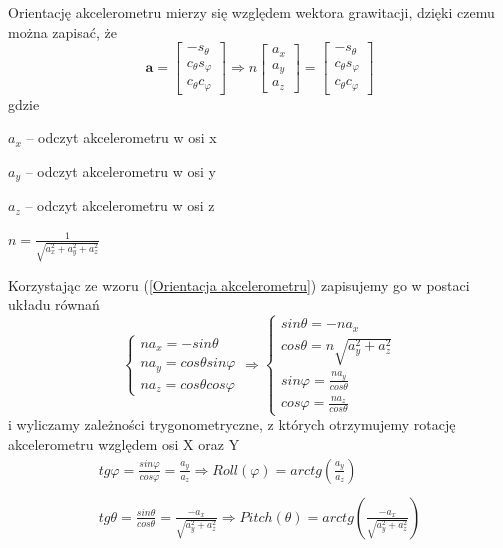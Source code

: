 Orientację akcelerometru mierzy się względem wektora grawitacji, dzięki czemu można zapisać, że
\begin{equation}
    \mathbf{a} =
    \left[
        \begin{array}{c}
            -s_{\theta} \\
            c_{\theta}s_{\varphi} \\
            c_{\theta}c_{\varphi}
        \end{array}
    \right]
    \Rightarrow
    n
    \left[
        \begin{array}{c}
            a_x \\
            a_y \\
            a_z
        \end{array}
    \right]
    =
    \left[
        \begin{array}{c}
            -s_{\theta} \\
            c_{\theta}s_{\varphi} \\
            c_{\theta}c_{\varphi}
        \end{array}
    \right]
    \label{Orientacja akcelerometru}
\end{equation}
gdzie

$a_x$ -- odczyt akcelerometru w osi x

$a_y$ -- odczyt akcelerometru w osi y

$a_z$ -- odczyt akcelerometru w osi z

$n = \frac{1}{\sqrt{a_x^2 + a_y^2 + a_z^2}}$ 


Korzystając ze wzoru (\ref{Orientacja akcelerometru}) zapisujemy go w postaci układu równań
$$
    \left\{
        \begin{array}{l}
            na_x = -sin\theta\\
            na_y = cos\theta sin\varphi\\
            na_z = cos\theta cos\varphi
        \end{array}
    \right.
    \Rightarrow
    \left\{
        \begin{array}{l}
            sin\theta = -na_x \\
            cos\theta = n\sqrt{a_y^2 + a_z^2} \\
            sin\varphi = \frac{na_y}{cos\theta} \\
            cos\varphi = \frac{na_z}{cos\theta}
        \end{array}
    \right.
$$
i wyliczamy zależności trygonometryczne, z których otrzymujemy rotację akcelerometru względem osi X oraz Y
\begin{equation}
    \begin{array}{l}
        tg\varphi = \frac{sin\varphi}{cos\varphi} = \frac{a_y}{a_z} \Rightarrow Roll(\varphi) = arctg(\frac{a_y}{a_z}) \\ \\
        tg\theta = \frac{sin\theta}{cos\theta} = \frac{-a_x}{\sqrt{a_y^2+a_z^2}} \Rightarrow Pitch(\theta) = arctg\left(\frac{-a_x}{\sqrt{a_y^2+a_z^2}}\right)
    \end{array}
\end{equation}

